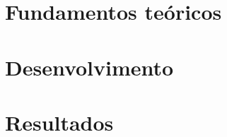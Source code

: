 \documentclass[ twoside,openright,titlepage,numbers=noenddot,headinclude,%
                footinclude=true,cleardoublepage=empty,abstractoff, %
                BCOR=5mm,paper=a4,fontsize=11pt,%
                american,%
                ]{scrreprt}
\begin{document}
 \frenchspacing \raggedbottom {} %
 \pagestyle{plain}
 
 
\cleardoublepage 
\pagestyle{scrheadings} \cleardoublepage
\cleardoublepage{} %
\cleardoublepage
\part{Fundamentos teóricos} 

 
 
\cleardoublepage 

\part{Desenvolvimento}
 


\cleardoublepage
\part{Resultados}
% 
 

\end{document}
